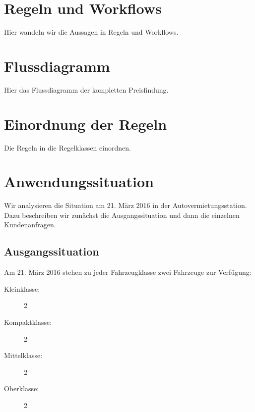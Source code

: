 



\setcounter{secnumdepth}{3}
\setcounter{tocdepth}{2}

\pagestyle{empty}


\tableofcontents
\setcounter{page}{1}

\pagestyle{scrheadings}

\newpage

\section{Regeln und Workflows}

Hier wandeln wir die Aussagen in Regeln und Workflows.

\section{Flussdiagramm}

Hier das Flussdiagramm der kompletten Preisfindung.

\section{Einordnung der Regeln}

Die Regeln in die Regelklassen einordnen.

\section{Anwendungssituation}

Wir analysieren die Situation am 21. März 2016 in der Autovermietungsstation.
Dazu beschreiben wir zunächst die Ausgangssituation und dann die einzelnen Kundenanfragen.

\subsection{Ausgangssituation}

Am 21. März 2016 stehen zu jeder Fahrzeugklasse zwei Fahrzeuge zur Verfügung:
\begin{description}
	\item[Kleinklasse:] 2
	\item[Kompaktklasse:] 2
	\item[Mittelklasse:] 2
	\item[Oberklasse:] 2
\end{description}

